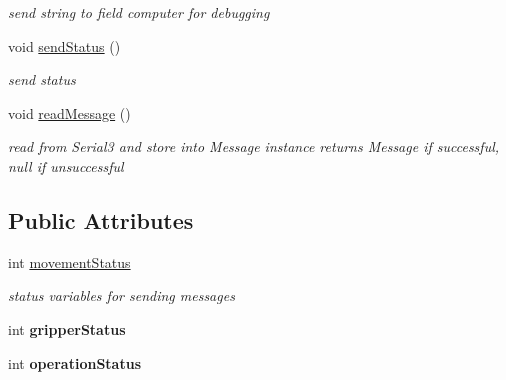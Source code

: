 \begin{DoxyCompactItemize}
\begin{DoxyCompactList}\small\item\em send string to field computer for debugging \end{DoxyCompactList}\item 
\hypertarget{classBTClient_a8820e63eebe5ab16fac9b7cb522fc55a}{void \hyperlink{classBTClient_a8820e63eebe5ab16fac9b7cb522fc55a}{send\-Status} ()}\label{classBTClient_a8820e63eebe5ab16fac9b7cb522fc55a}

\begin{DoxyCompactList}\small\item\em send status \end{DoxyCompactList}\item 
\hypertarget{classBTClient_a8e827d16926d45a4b7c18dda0e59837b}{void \hyperlink{classBTClient_a8e827d16926d45a4b7c18dda0e59837b}{read\-Message} ()}\label{classBTClient_a8e827d16926d45a4b7c18dda0e59837b}

\begin{DoxyCompactList}\small\item\em read from Serial3 and store into Message instance returns Message if successful, null if unsuccessful \end{DoxyCompactList}\end{DoxyCompactItemize}
\subsection*{Public Attributes}
\begin{DoxyCompactItemize}
\item 
\hypertarget{classBTClient_aacff467239e0a6a85eab0ac77dbcfdf8}{int \hyperlink{classBTClient_aacff467239e0a6a85eab0ac77dbcfdf8}{movement\-Status}}\label{classBTClient_aacff467239e0a6a85eab0ac77dbcfdf8}

\begin{DoxyCompactList}\small\item\em status variables for sending messages \end{DoxyCompactList}\item 
\hypertarget{classBTClient_acdb5a8d964742a7236d2d0acc2e45585}{int {\bfseries gripper\-Status}}\label{classBTClient_acdb5a8d964742a7236d2d0acc2e45585}

\item 
\hypertarget{classBTClient_a419405603d661e07e630a6649e9592a0}{int {\bfseries operation\-Status}}\label{classBTClient_a419405603d661e07e630a6649e9592a0}

\end{DoxyCompactItemize}


